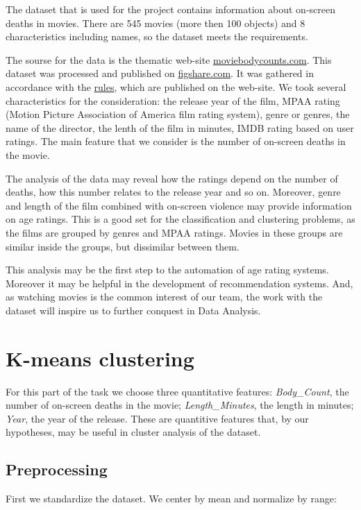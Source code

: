 \documentclass[a4paper,14pt]{article}
\begin{document}
    The dataset that is used for the project contains information about  on-screen deaths in movies. There are 545 movies (more then 100 objects) and 8 characteristics including names, so the dataset meets the requirements. 
    
    The sourse for the data is the thematic web-site \href{http://www.moviebodycounts.com/}{moviebodycounts.com}. This dataset was processed and published on \href{https://figshare.com/articles/On_screen_movie_kill_counts_for_hundreds_of_films/889719}{figshare.com}. It was gathered  in accordance with the \href{http://moviebodycounts.proboards.com/thread/6}{rules}, which are published on the web-site. We took several characteristics for the consideration: the release year of the film, MPAA rating (Motion Picture Association of America film rating system), genre or genres, the name of the director, the lenth of the film in minutes,  IMDB rating based on user ratings. The main feature that we consider is the number of on-screen deaths in the movie. 
    
    The analysis of the data may reveal how the ratings depend on the number of deaths, how this number relates to the release year and so on. Moreover, genre and length of the film combined with on-screen violence may provide information on age ratings. This is a good set for the classification and clustering problems, as the films are grouped by genres and MPAA ratings. Movies in these groups are similar inside the groups, but dissimilar between them. 
    
    This analysis may be the first step to the automation of age rating systems. Moreover it may be helpful in the development of recommendation systems. And, as watching movies is the common interest of our team, the work with the dataset will inspire us to further conquest in Data Analysis.
    
    
    \newpage
    
    \section{K-means clustering}
    
 For this part of the task we choose three quantitative features:\textit{ Body\_Count}, the number of on-screen deaths in the movie; \textit{Length\_Minutes}, the length in minutes; \textit{Year}, the year of the release. These are quantitive features that, by our hypotheses, may be useful in cluster analysis of the dataset.
 
 \subsection{Preprocessing}
 First we standardize the dataset. We center by mean and normalize by range:
 
\end{document}
